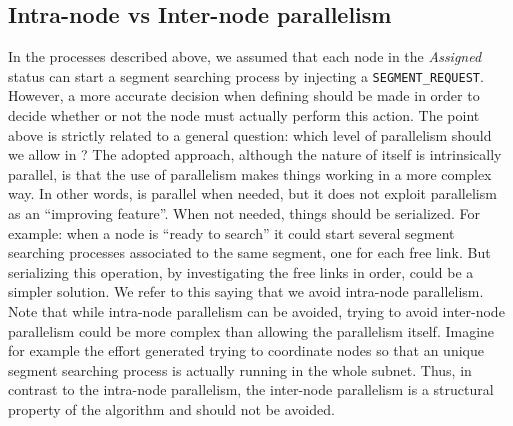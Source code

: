 \subsection{Intra-node vs Inter-node parallelism}
In the processes described above, we assumed that each node in the
\emph{Assigned} status can start a segment searching process by injecting a
\texttt{SEGMENT\_REQUEST}. However, a more accurate decision when
defining \disr{} should be made in order to decide whether or not the
node must actually perform this action. The point above is
strictly related to a general question: which level of
parallelism should we allow in \disr{}? The adopted approach, although
the nature of \disr{} itself is intrinsically parallel, is that the use of
parallelism makes things working in a more complex way. In other words,
\disr{} is parallel when needed, but it does not exploit parallelism
as an ``improving feature''. When not needed, things should be
serialized. For example: when a node is ``ready to search'' it could start
several segment searching processes associated to the same segment, one for
each free link. But serializing this operation, by investigating the free links
in order, could be a simpler solution. We refer to this saying that we
avoid intra-node parallelism.  Note that while intra-node parallelism
can be avoided, trying to avoid inter-node parallelism could be more
complex than allowing the parallelism itself. Imagine for example the
effort generated trying to coordinate nodes so that an unique segment searching
process is actually running in the whole subnet. Thus, in contrast to
the intra-node parallelism, the inter-node parallelism is a structural
property of the \disr{} algorithm and should not be avoided.
